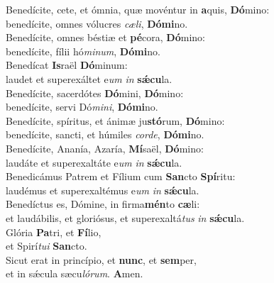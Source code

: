 \oddverse Benedícite, cete, et ómnia, quæ movéntur in \textbf{a}quis, \textbf{Dó}mino:~\*\\
\oddverse benedícite, omnes vólucres \textit{cæ}\textit{li}, \textbf{Dó}\textbf{mi}no.\\
\evenverse Benedícite, omnes béstiæ et \textbf{pé}cora, \textbf{Dó}mino:~\*\\
\evenverse benedícite, fílii hó\textit{mi}\textit{num}, \textbf{Dó}\textbf{mi}no.\\
\oddverse Benedícat \textbf{Is}raël \textbf{Dó}minum:~\*\\
\oddverse laudet et superexáltet e\textit{um} \textit{in} \textbf{sǽ}\textbf{cu}la.\\
\evenverse Benedícite, sacerdótes \textbf{Dó}mini, \textbf{Dó}mino:~\*\\
\evenverse benedícite, servi Dó\textit{mi}\textit{ni}, \textbf{Dó}\textbf{mi}no.\\
\oddverse Benedícite, spíritus, et ánimæ ju\textbf{stó}rum, \textbf{Dó}mino:~\*\\
\oddverse benedícite, sancti, et húmiles \textit{cor}\textit{de}, \textbf{Dó}\textbf{mi}no.\\
\evenverse Benedícite, Ananía, Azaría, \textbf{Mí}saël, \textbf{Dó}mino:~\*\\
\evenverse laudáte et superexaltáte e\textit{um} \textit{in} \textbf{sǽ}\textbf{cu}la.\\
\oddverse Benedicámus Patrem et Fílium cum \textbf{San}cto \textbf{Spí}ritu:~\*\\
\oddverse laudémus et superexaltémus e\textit{um} \textit{in} \textbf{sǽ}\textbf{cu}la.\\
\evenverse Benedíctus es, Dómine, in firma\textbf{mén}to \textbf{cæ}li:~\*\\
\evenverse et laudábilis, et gloriósus, et superexaltá\textit{tus} \textit{in} \textbf{sǽ}\textbf{cu}la.\\
\oddverse Glória \textbf{Pa}tri, et \textbf{Fí}lio,~\*\\
\oddverse et Spirí\textit{tu}\textit{i} \textbf{San}cto.\\
\evenverse Sicut erat in princípio, et \textbf{nunc}, et \textbf{sem}per,~\*\\
\evenverse et in sǽcula sæcu\textit{ló}\textit{rum}. \textbf{A}men.\\
